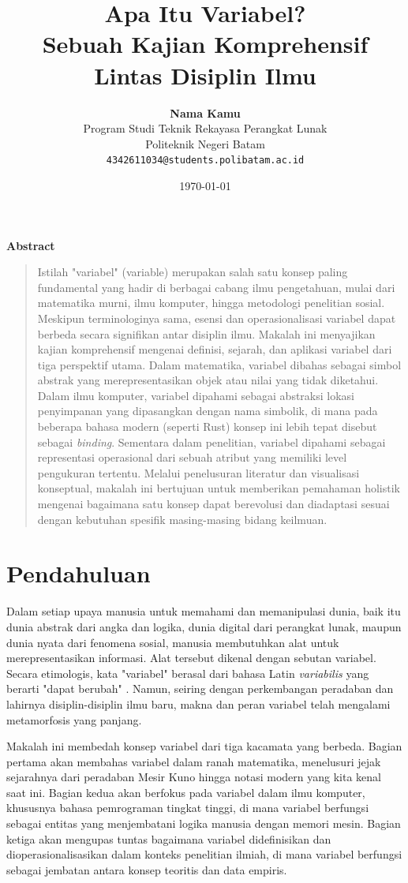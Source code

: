 \documentclass[11pt,a4paper]{article}
\title{\vspace{-1cm}\textbf{\sffamily\LARGE Apa Itu Variabel?\\ Sebuah Kajian Komprehensif Lintas Disiplin Ilmu}}
\author{
	\textbf{Nama Kamu} \\
	\small Program Studi Teknik Rekayasa Perangkat Lunak \\
	\small Politeknik Negeri Batam \\
	\small \texttt{4342611034@students.polibatam.ac.id}
}
\date{\small\today}
\renewenvironment{abstract}
{\small
	\begin{center}\textbf{\sffamily Abstract}\end{center}
	\begin{quote}}
	{\end{quote}}
\begin{document}
\maketitle
\thispagestyle{empty}

\begin{abstract}
	Istilah "variabel" (variable) merupakan salah satu konsep paling fundamental yang hadir di berbagai cabang ilmu pengetahuan, mulai dari matematika murni, ilmu komputer, hingga metodologi penelitian sosial. Meskipun terminologinya sama, esensi dan operasionalisasi variabel dapat berbeda secara signifikan antar disiplin ilmu. Makalah ini menyajikan kajian komprehensif mengenai definisi, sejarah, dan aplikasi variabel dari tiga perspektif utama. Dalam matematika, variabel dibahas sebagai simbol abstrak yang merepresentasikan objek atau nilai yang tidak diketahui. Dalam ilmu komputer, variabel dipahami sebagai abstraksi lokasi penyimpanan yang dipasangkan dengan nama simbolik, di mana pada beberapa bahasa modern (seperti Rust) konsep ini lebih tepat disebut sebagai \textit{binding}. Sementara dalam penelitian, variabel dipahami sebagai representasi operasional dari sebuah atribut yang memiliki level pengukuran tertentu. Melalui penelusuran literatur dan visualisasi konseptual, makalah ini bertujuan untuk memberikan pemahaman holistik mengenai bagaimana satu konsep dapat berevolusi dan diadaptasi sesuai dengan kebutuhan spesifik masing-masing bidang keilmuan.
\end{abstract}

\section{Pendahuluan}

Dalam setiap upaya manusia untuk memahami dan memanipulasi dunia, baik itu dunia abstrak dari angka dan logika, dunia digital dari perangkat lunak, maupun dunia nyata dari fenomena sosial, manusia membutuhkan alat untuk merepresentasikan informasi. Alat tersebut dikenal dengan sebutan variabel. Secara etimologis, kata "variabel" berasal dari bahasa Latin \textit{variabilis} yang berarti "dapat berubah" \cite{wikipedia_math}. Namun, seiring dengan perkembangan peradaban dan lahirnya disiplin-disiplin ilmu baru, makna dan peran variabel telah mengalami metamorfosis yang panjang.

Makalah ini membedah konsep variabel dari tiga kacamata yang berbeda. Bagian pertama akan membahas variabel dalam ranah matematika, menelusuri jejak sejarahnya dari peradaban Mesir Kuno hingga notasi modern yang kita kenal saat ini. Bagian kedua akan berfokus pada variabel dalam ilmu komputer, khususnya bahasa pemrograman tingkat tinggi, di mana variabel berfungsi sebagai entitas yang menjembatani logika manusia dengan memori mesin. Bagian ketiga akan mengupas tuntas bagaimana variabel didefinisikan dan dioperasionalisasikan dalam konteks penelitian ilmiah, di mana variabel berfungsi sebagai jembatan antara konsep teoritis dan data empiris.
\end{document}
